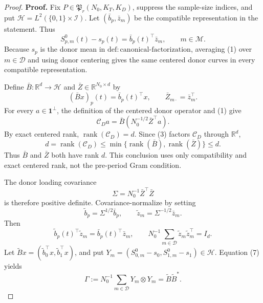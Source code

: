 \documentclass{article}
\begin{document}
\begin{proof}
\textbf{Proof.}
Fix \(P\in\mathfrak P_r(N_0,K_T,K_D)\), suppress the sample-size indices,
and put \(\mathcal H=L^2(\{0,1\}\times\mathcal I)\).  Let
\((\bar b_p,\bar z_m)\) be the compatible representation in the statement.
Thus
\[
 S^0_{p,m}(t)-s_p(t)=\bar b_p(t)^\top\bar z_m,
 \qquad m\in\mathcal M.                                  \tag{1}
\]
Because \(s_p\) is the donor mean in
\(\mathrm{def:canonical\mbox{-}factorization}\), averaging (1) over
\(m\in\mathcal D\) and using donor centering gives the same centered donor
curves in every compatible representation.

Define \(\bar B:\mathbb R^d\to\mathcal H\) and
\(\bar Z\in\mathbb R^{N_0\times d}\) by
\[
 (\bar Bx)_p(t)=\bar b_p(t)^\top x,
 \qquad \bar Z_{m\cdot}=\bar z_m^\top.                  \tag{2}
\]
For every \(a\in\mathbf 1^\perp\), the definition of the centered donor
operator and (1) give
\[
 \mathcal C_Da
 =\bar B\left(N_0^{-1/2}\bar Z^\top a\right).           \tag{3}
\]
By exact centered rank, \(\operatorname{rank}(\mathcal C_D)=d\).  Since
(3) factors \(\mathcal C_D\) through \(\mathbb R^d\),
\[
 d=\operatorname{rank}(\mathcal C_D)
 \leq\min\{\operatorname{rank}(\bar B),
             \operatorname{rank}(\bar Z)\}\leq d.       \tag{4}
\]
Thus \(\bar B\) and \(\bar Z\) both have rank \(d\).  This conclusion uses
only compatibility and exact centered rank, not the pre-period Gram condition.

The donor loading covariance
\[
 \Sigma=N_0^{-1}\bar Z^\top\bar Z                       \tag{5}
\]
is therefore positive definite.  Covariance-normalize by setting
\[
 \widetilde b_p=\Sigma^{1/2}\bar b_p,
 \qquad \widetilde z_m=\Sigma^{-1/2}\bar z_m.           \tag{6}
\]
Then
\[
 \widetilde b_p(t)^\top\widetilde z_m
 =\bar b_p(t)^\top\bar z_m,
 \qquad
 N_0^{-1}\sum_{m\in\mathcal D}
 \widetilde z_m\widetilde z_m^\top=I_d.                 \tag{7}
\]
Let \(\widetilde Bx=(\widetilde b_0^\top x,
\widetilde b_1^\top x)\), and put
\(Y_m=(S^0_{0,m}-s_0,S^0_{1,m}-s_1)\in\mathcal H\).  Equation (7) yields
\[
 \Gamma:=N_0^{-1}\sum_{m\in\mathcal D}Y_m\otimes Y_m
 =\widetilde B\widetilde B^*.                            \tag{8}
\]


\end{proof}
\end{document}
